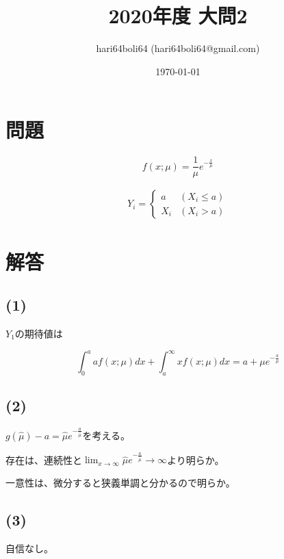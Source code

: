 \documentclass[a4paper, 10pt, dvipdfmx]{jlreq}
\begin{document}
\title{2020年度 大問2}
\author{hari64boli64 (hari64boli64@gmail.com)}
\date{\today}
\maketitle


\section{問題}

\begin{equation*}
  f(x;\mu)=\frac{1}{\mu}e^{-\frac{x}{\mu}}
\end{equation*}

\begin{align*}
  Y_i= \left\{
  \begin{array}{ll}
    a   & (X_i \leq a) \\
    X_i & (X_i > a)
  \end{array}
  \right.
\end{align*}

\section{解答}

\subsection*{(1)}

$Y_1$の期待値は

\begin{equation*}
  \int_0^a af(x;\mu)dx + \int_a^\infty xf(x;\mu)dx=a+\mu e^{-\frac{a}{\mu}}
\end{equation*}

\subsection*{(2)}

$g(\hat{\mu})-a=\hat{\mu}e^{-\frac{a}{\hat{\mu}}}$を考える。

存在は、連続性と$\lim_{x \to \infty}\hat{\mu}e^{-\frac{a}{\hat{\mu}}} \to \infty$より明らか。

一意性は、微分すると狭義単調と分かるので明らか。

\subsection*{(3)}

自信なし。
\end{document}
